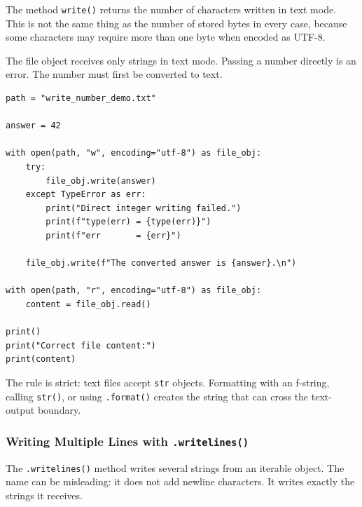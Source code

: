 The method \texttt{write()} returns the number of characters written in text mode. This is not the same thing as the number of stored bytes in every case, because some characters may require more than one byte when encoded as UTF-8.

The file object receives only strings in text mode. Passing a number directly is an error. The number must first be converted to text.

\begin{verbatim}
path = "write_number_demo.txt"

answer = 42

with open(path, "w", encoding="utf-8") as file_obj:
    try:
        file_obj.write(answer)
    except TypeError as err:
        print("Direct integer writing failed.")
        print(f"type(err) = {type(err)}")
        print(f"err       = {err}")

    file_obj.write(f"The converted answer is {answer}.\n")

with open(path, "r", encoding="utf-8") as file_obj:
    content = file_obj.read()

print()
print("Correct file content:")
print(content)
\end{verbatim}

The rule is strict: text files accept \texttt{str} objects. Formatting with an f-string, calling \texttt{str()}, or using \texttt{.format()} creates the string that can cross the text-output boundary.

\subsubsection{Writing Multiple Lines with \texttt{.writelines()}}

The \texttt{.writelines()} method writes several strings from an iterable object. The name can be misleading: it does not add newline characters. It writes exactly the strings it receives.

